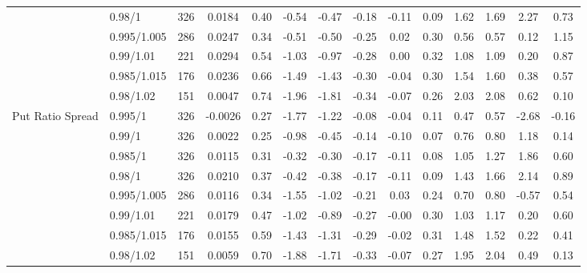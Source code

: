 \begin{tabular}{llcccccccccccc}
 & 0.98/1 & 326 & 0.0184 & 0.40 & -0.54 & -0.47 & -0.18 & -0.11 & 0.09 & 1.62 & 1.69 & 2.27 & 0.73 \\
 & 0.995/1.005 & 286 & 0.0247 & 0.34 & -0.51 & -0.50 & -0.25 & 0.02 & 0.30 & 0.56 & 0.57 & 0.12 & 1.15 \\
 & 0.99/1.01 & 221 & 0.0294 & 0.54 & -1.03 & -0.97 & -0.28 & 0.00 & 0.32 & 1.08 & 1.09 & 0.20 & 0.87 \\
 & 0.985/1.015 & 176 & 0.0236 & 0.66 & -1.49 & -1.43 & -0.30 & -0.04 & 0.30 & 1.54 & 1.60 & 0.38 & 0.57 \\
 & 0.98/1.02 & 151 & 0.0047 & 0.74 & -1.96 & -1.81 & -0.34 & -0.07 & 0.26 & 2.03 & 2.08 & 0.62 & 0.10 \\
Put Ratio Spread & 0.995/1 & 326 & -0.0026 & 0.27 & -1.77 & -1.22 & -0.08 & -0.04 & 0.11 & 0.47 & 0.57 & -2.68 & -0.16 \\
 & 0.99/1 & 326 & 0.0022 & 0.25 & -0.98 & -0.45 & -0.14 & -0.10 & 0.07 & 0.76 & 0.80 & 1.18 & 0.14 \\
 & 0.985/1 & 326 & 0.0115 & 0.31 & -0.32 & -0.30 & -0.17 & -0.11 & 0.08 & 1.05 & 1.27 & 1.86 & 0.60 \\
 & 0.98/1 & 326 & 0.0210 & 0.37 & -0.42 & -0.38 & -0.17 & -0.11 & 0.09 & 1.43 & 1.66 & 2.14 & 0.89 \\
 & 0.995/1.005 & 286 & 0.0116 & 0.34 & -1.55 & -1.02 & -0.21 & 0.03 & 0.24 & 0.70 & 0.80 & -0.57 & 0.54 \\
 & 0.99/1.01 & 221 & 0.0179 & 0.47 & -1.02 & -0.89 & -0.27 & -0.00 & 0.30 & 1.03 & 1.17 & 0.20 & 0.60 \\
 & 0.985/1.015 & 176 & 0.0155 & 0.59 & -1.43 & -1.31 & -0.29 & -0.02 & 0.31 & 1.48 & 1.52 & 0.22 & 0.41 \\
 & 0.98/1.02 & 151 & 0.0059 & 0.70 & -1.88 & -1.71 & -0.33 & -0.07 & 0.27 & 1.95 & 2.04 & 0.49 & 0.13 \\
\bottomrule
\end{tabular}
